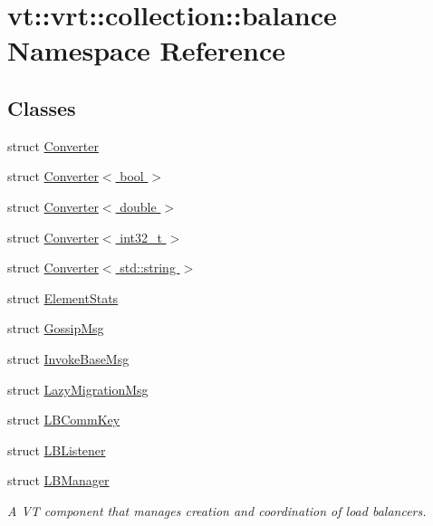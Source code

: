 \hypertarget{namespacevt_1_1vrt_1_1collection_1_1balance}{}\section{vt\+:\+:vrt\+:\+:collection\+:\+:balance Namespace Reference}
\label{namespacevt_1_1vrt_1_1collection_1_1balance}
\subsection*{Classes}
\begin{DoxyCompactItemize}
\item 
struct \hyperlink{structvt_1_1vrt_1_1collection_1_1balance_1_1_converter}{Converter}
\item 
struct \hyperlink{structvt_1_1vrt_1_1collection_1_1balance_1_1_converter_3_01bool_01_4}{Converter$<$ bool $>$}
\item 
struct \hyperlink{structvt_1_1vrt_1_1collection_1_1balance_1_1_converter_3_01double_01_4}{Converter$<$ double $>$}
\item 
struct \hyperlink{structvt_1_1vrt_1_1collection_1_1balance_1_1_converter_3_01int32__t_01_4}{Converter$<$ int32\+\_\+t $>$}
\item 
struct \hyperlink{structvt_1_1vrt_1_1collection_1_1balance_1_1_converter_3_01std_1_1string_01_4}{Converter$<$ std\+::string $>$}
\item 
struct \hyperlink{structvt_1_1vrt_1_1collection_1_1balance_1_1_element_stats}{Element\+Stats}
\item 
struct \hyperlink{structvt_1_1vrt_1_1collection_1_1balance_1_1_gossip_msg}{Gossip\+Msg}
\item 
struct \hyperlink{structvt_1_1vrt_1_1collection_1_1balance_1_1_invoke_base_msg}{Invoke\+Base\+Msg}
\item 
struct \hyperlink{structvt_1_1vrt_1_1collection_1_1balance_1_1_lazy_migration_msg}{Lazy\+Migration\+Msg}
\item 
struct \hyperlink{structvt_1_1vrt_1_1collection_1_1balance_1_1_l_b_comm_key}{L\+B\+Comm\+Key}
\item 
struct \hyperlink{structvt_1_1vrt_1_1collection_1_1balance_1_1_l_b_listener}{L\+B\+Listener}
\item 
struct \hyperlink{structvt_1_1vrt_1_1collection_1_1balance_1_1_l_b_manager}{L\+B\+Manager}
\begin{DoxyCompactList}\small\item\em A VT component that manages creation and coordination of load balancers. \end{DoxyCompactList}\item 

\end{DoxyCompactItemize}
